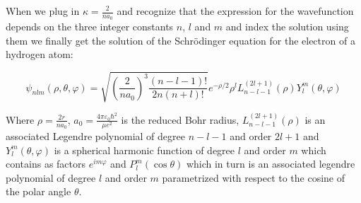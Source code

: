 \documentclass{article}
\begin{document}
    When we plug in $\kappa = \frac{2}{na_{0}}$ and recognize that the expression for the wavefunction depends on the three integer constants $n$, $l$ and $m$ and index the solution using 
    them we finally get the solution of the Schrödinger equation for the electron of a hydrogen atom:

    \begin{equation}
        \boxed{
            \psi_{nlm}(\rho, \theta, \varphi) = \sqrt{\left( \frac{2}{na_{0}} \right)^3\frac{(n - l - 1)!}{2n(n + l)!}}e^{-\rho/2}\rho^{l}L^{(2l+1)}_{n-l-1}(\rho)Y^{m}_{l}(\theta, \varphi) 
        }
    \end{equation}

    Where $\rho = \frac{2r}{na_{0}}$, $a_{0} = \frac{4\pi\varepsilon_{0}\hbar^2}{\mu e^2}$ is the reduced Bohr radius, $L^{(2l + 1)}_{n - l - 1}(\rho)$ is an associated Legendre polynomial
    of degree $n - l - 1$ and order $2l + 1$ and $Y^{m}_{l}(\theta, \varphi)$ is a spherical harmonic function of degree $l$ and order $m$ which contains as factors $e^{im\varphi}$ and
    $P^{m}_{l}( \cos\theta)$ which in turn is an associated legendre polynomial of degree $l$ and order $m$ parametrized with respect to the cosine of the polar angle $\theta$. 
    



    
    
    
\end{document}
